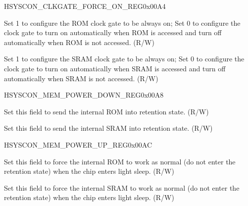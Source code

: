 \begin{register}{H}{SYSCON\_CLKGATE\_FORCE\_ON\_REG}{0x00A4}\label{regdesc:SYSCONCLKGATEFORCEONREG}
%
%
%
\regnewline%
\begin{regdesc}\begin{reglist}
\label{fielddesc:SYSCONROMCLKGATEFORCEON}\item [SYSCON\_ROM\_CLKGATE\_FORCE\_ON] Set 1 to configure the ROM clock gate to be always on; Set 0 to configure the clock gate to turn on automatically when ROM is accessed and turn off automatically when ROM is not accessed. (R/W)
\label{fielddesc:SYSCONSRAMCLKGATEFORCEON}\item [SYSCON\_SRAM\_CLKGATE\_FORCE\_ON] Set 1 to configure the SRAM clock gate to be always on; Set 0 to configure the clock gate to turn on automatically when SRAM is accessed and turn off automatically when SRAM is not accessed. (R/W)
\end{reglist}\end{regdesc}
\end{register}


\begin{register}{H}{SYSCON\_MEM\_POWER\_DOWN\_REG}{0x00A8}\label{regdesc:SYSCONMEMPOWERDOWNREG}
%
%
%
\regnewline%
\begin{regdesc}\begin{reglist}
\label{fielddesc:SYSCONROMPOWERDOWN}\item [SYSCON\_ROM\_POWER\_DOWN] Set this field to send the internal ROM into retention state. (R/W)
\label{fielddesc:SYSCONSRAMPOWERDOWN}\item [SYSCON\_SRAM\_POWER\_DOWN] Set this field to send the internal SRAM into retention state. (R/W)
\end{reglist}\end{regdesc}
\end{register}

\begin{register}{H}{SYSCON\_MEM\_POWER\_UP\_REG}{0x00AC}\label{regdesc:SYSCONMEMPOWERUPREG}
%
%
%
\regnewline%
\begin{regdesc}\begin{reglist}
\label{fielddesc:SYSCONROMPOWERUP}\item [SYSCON\_ROM\_POWER\_UP] Set this field to force the internal ROM to work as normal (do not enter the retention state) when the chip enters light sleep. (R/W)
\label{fielddesc:SYSCONSRAMPOWERUP}\item [SYSCON\_SRAM\_POWER\_UP] Set this field to force the internal SRAM to work as normal (do not enter the retention state) when the chip enters light sleep. (R/W)
\end{reglist}\end{regdesc}
\end{register}
